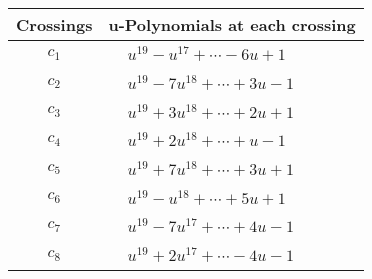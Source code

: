 \documentclass[1p]{elsarticle_modified}
\theoremstyle{definition}
\begin{document}
\begin{tabular}{m{50pt}|m{274pt}}
Crossings & \hspace{64pt}u-Polynomials at each crossing \\
\hline $$\begin{aligned}c_{1}\end{aligned}$$&$\begin{aligned}
&u^{19}- u^{17}+\cdots-6 u+1
\end{aligned}$\\
\hline $$\begin{aligned}c_{2}\end{aligned}$$&$\begin{aligned}
&u^{19}-7 u^{18}+\cdots+3 u-1
\end{aligned}$\\
\hline $$\begin{aligned}c_{3}\end{aligned}$$&$\begin{aligned}
&u^{19}+3 u^{18}+\cdots+2 u+1
\end{aligned}$\\
\hline $$\begin{aligned}c_{4}\end{aligned}$$&$\begin{aligned}
&u^{19}+2 u^{18}+\cdots+u-1
\end{aligned}$\\
\hline $$\begin{aligned}c_{5}\end{aligned}$$&$\begin{aligned}
&u^{19}+7 u^{18}+\cdots+3 u+1
\end{aligned}$\\
\hline $$\begin{aligned}c_{6}\end{aligned}$$&$\begin{aligned}
&u^{19}- u^{18}+\cdots+5 u+1
\end{aligned}$\\
\hline $$\begin{aligned}c_{7}\end{aligned}$$&$\begin{aligned}
&u^{19}-7 u^{17}+\cdots+4 u-1
\end{aligned}$\\
\hline $$\begin{aligned}c_{8}\end{aligned}$$&$\begin{aligned}
&u^{19}+2 u^{17}+\cdots-4 u-1
\end{aligned}$\\

\end{tabular}
\end{document}

